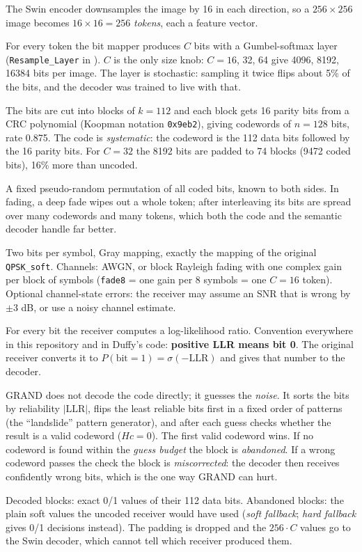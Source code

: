 \documentclass{article}
\begin{document}
\begin{description}[style=nextline]
\item[Encoder and tokens.] The Swin encoder downsamples the image by 16 in each direction, so a
$256\times256$ image becomes $16\times16=256$ \emph{tokens}, each a feature vector.
\item[Bit mapper and $C$.] For every token the bit mapper produces $C$ bits with a Gumbel-softmax
layer (\texttt{Resample\_Layer} in ). $C$ is the only size knob: $C=16$, 32, 64
give 4096, 8192, 16384 bits per image. The layer is stochastic: sampling it twice flips about 5\% of
the bits, and the decoder was trained to live with that.
\item[CRC code (ours).] The bits are cut into blocks of $k=112$ and each block gets 16 parity bits from
a CRC polynomial (Koopman notation \texttt{0x9eb2}), giving codewords of $n=128$ bits, rate 0.875. The
code is \emph{systematic}: the codeword is the 112 data bits followed by the 16 parity bits. For $C=32$
the 8192 bits are padded to 74 blocks (9472 coded bits), 16\% more than uncoded.
\item[Interleaver (ours).] A fixed pseudo-random permutation of all coded bits, known to both sides.
In fading, a deep fade wipes out a whole token; after interleaving its bits are spread over many
codewords and many tokens, which both the code and the semantic decoder handle far better.
\item[QPSK and channel.] Two bits per symbol, Gray mapping, exactly the mapping of the original
\texttt{QPSK\_soft}. Channels: AWGN, or block Rayleigh fading with one complex gain per block of
symbols (\texttt{fade8} = one gain per 8 symbols = one $C=16$ token). Optional channel-state errors:
the receiver may assume an SNR that is wrong by $\pm3$ dB, or use a noisy channel estimate.
\item[LLR.] For every bit the receiver computes a log-likelihood ratio. Convention everywhere in this
repository and in Duffy's code: \textbf{positive LLR means bit 0}. The original receiver converts it to
$P(\text{bit}=1)=\sigma(-\mathrm{LLR})$ and gives that number to the decoder.
\item[ORBGRAND (ours).] GRAND does not decode the code directly; it guesses the \emph{noise}. It sorts
the bits by reliability $|\mathrm{LLR}|$, flips the least reliable bits first in a fixed order of
patterns (the ``landslide'' pattern generator), and after each guess checks whether the result is a
valid codeword ($Hc=0$). The first valid codeword wins. If no codeword is found within the \emph{guess
budget} the block is \emph{abandoned}. If a wrong codeword passes the check the block is
\emph{miscorrected}: the decoder then receives confidently wrong bits, which is the one way GRAND can
hurt.
\item[What the decoder receives (ours).] Decoded blocks: exact 0/1 values of their 112 data bits.
Abandoned blocks: the plain soft values the uncoded receiver would have used (\emph{soft fallback};
\emph{hard fallback} gives 0/1 decisions instead). The padding is dropped and the $256\cdot C$ values
go to the Swin decoder, which cannot tell which receiver produced them.
\end{description}
\end{document}
